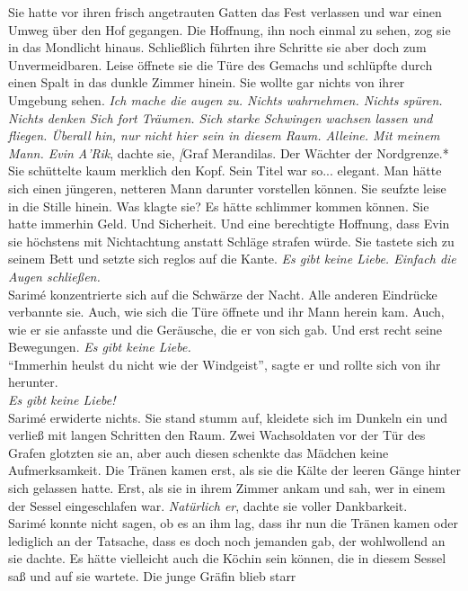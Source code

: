 Sie hatte vor ihren frisch angetrauten Gatten das Fest verlassen und war einen Umweg über den Hof 
gegangen. Die Hoffnung, ihn noch einmal zu sehen, zog sie in das Mondlicht hinaus. Schließlich 
führten ihre Schritte sie aber doch zum Unvermeidbaren. Leise öffnete sie die Türe des Gemachs und 
schlüpfte durch einen Spalt in das dunkle Zimmer hinein. Sie wollte gar nichts von ihrer Umgebung 
sehen. \textit{Ich mache die augen zu. Nichts wahrnehmen. Nichts spüren. Nichts denken Sich fort 
Träumen. Sich starke Schwingen wachsen lassen und fliegen. Überall hin, nur nicht hier sein in 
diesem Raum. Alleine. Mit meinem Mann. Evin A'Rik}, dachte sie, \textit[{Graf Merandilas. Der 
Wächter der Nordgrenze.*}\\
Sie schüttelte kaum merklich den Kopf. Sein Titel war so... elegant. Man hätte sich einen jüngeren, 
netteren Mann darunter vorstellen können. Sie seufzte leise in die Stille hinein. Was klagte sie? 
Es hätte schlimmer kommen können. Sie hatte immerhin Geld. Und Sicherheit. Und eine berechtigte 
Hoffnung, dass Evin sie höchstens mit Nichtachtung anstatt Schläge strafen würde. Sie tastete sich 
zu seinem Bett und setzte sich reglos auf die Kante. \textit{Es gibt keine Liebe. Einfach die Augen 
schließen.}\\
Sarimé konzentrierte sich auf die Schwärze der Nacht. Alle anderen Eindrücke verbannte sie. Auch, 
wie sich die Türe öffnete und ihr Mann herein kam. Auch, wie er sie anfasste und die Geräusche, die 
er von sich gab. Und erst recht seine Bewegungen. \textit{Es gibt keine Liebe.}\\
``Immerhin heulst du nicht wie der Windgeist'', sagte er und rollte sich von ihr herunter.\\
\textit{Es gibt keine Liebe!}\\
Sarimé erwiderte nichts. Sie stand stumm auf, kleidete sich im Dunkeln ein und verließ mit langen 
Schritten den Raum. Zwei Wachsoldaten vor der Tür des Grafen glotzten sie an, aber auch diesen 
schenkte das Mädchen keine Aufmerksamkeit. Die Tränen kamen erst, als sie die Kälte der leeren 
Gänge hinter sich gelassen hatte. Erst, als sie in ihrem Zimmer ankam und sah, wer in einem der 
Sessel eingeschlafen war. \textit{Natürlich er}, dachte sie voller Dankbarkeit.\\
Sarimé konnte nicht sagen, ob es an ihm lag, dass ihr nun die Tränen kamen oder lediglich an der 
Tatsache, dass es doch noch jemanden gab, der wohlwollend an sie dachte. Es hätte vielleicht auch 
die Köchin sein können, die in diesem Sessel saß und auf sie wartete. Die junge Gräfin blieb starr 
